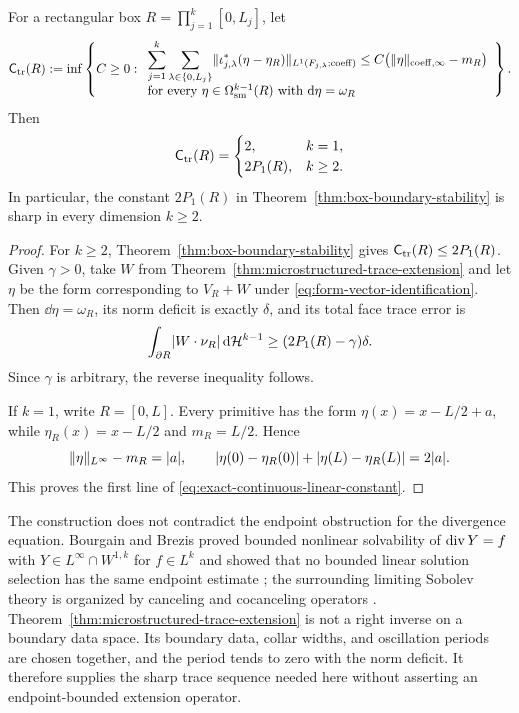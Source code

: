 \begin{theorem}
\label{thm:sharp-continuous-stability-constant}
For a rectangular box $R=\prod_{j=1}^k[0,L_j]$, let
\[
 \mathsf C_{\rm tr}(R):=
 \inf\left\{C\ge0:
 \begin{array}{l}
 \displaystyle
 \sum_{j=1}^k\sum_{\lambda\in\{0,L_j\}}
 \lVert \iota_{j,\lambda}^*(\eta-\eta_R) \rVert_{L^1(F_{j,\lambda};\mathrm{coeff})}
 \le C\bigl(\lVert \eta \rVert_{\mathrm{coeff},\infty}-m_R\bigr)\\[2mm]
 \text{for every }\eta\in\Omega^{k-1}_{\rm sm}(R)
 \text{ with }\mathrm{d}\eta=\omega_R
 \end{array}
 \right\}.
\]
Then
\begin{equation}
\label{eq:exact-continuous-linear-constant}
 \mathsf C_{\rm tr}(R)=
 \begin{cases}
 2, & k=1,\\
 2P_1(R), & k\ge2.
 \end{cases}
\end{equation}
In particular, the constant $2P_1(R)$ in
Theorem~\ref{thm:box-boundary-stability} is sharp in every dimension
$k\ge2$.
\end{theorem}

\begin{proof}
For $k\ge2$, Theorem~\ref{thm:box-boundary-stability} gives
$\mathsf C_{\rm tr}(R)\le2P_1(R)$.  Given $\gamma>0$, take $W$ from
Theorem~\ref{thm:microstructured-trace-extension} and let $\eta$ be the form
corresponding to $V_R+W$ under \eqref{eq:form-vector-identification}.  Then
$\dd\eta=\omega_R$, its norm deficit is exactly $\delta$, and its total face
trace error is
\[
 \int_{\partial R}\lvert W\cdot\nu_R \rvert\,\mathrm{d}\mathcal{H}^{k-1}
 \ge(2P_1(R)-\gamma)\delta.
\]
Since $\gamma$ is arbitrary, the reverse inequality follows.

If $k=1$, write $R=[0,L]$.  Every primitive has the form
$\eta(x)=x-L/2+a$, while $\eta_R(x)=x-L/2$ and $m_R=L/2$.  Hence
\[
 \lVert \eta \rVert_{L^\infty}-m_R=\lvert a \rvert,
 \qquad
 \lvert \eta(0)-\eta_R(0) \rvert+\lvert \eta(L)-\eta_R(L) \rvert=2\lvert a \rvert.
\]
This proves the first line of \eqref{eq:exact-continuous-linear-constant}.
\end{proof}

The construction does not contradict the endpoint obstruction for the
divergence equation.  Bourgain and Brezis proved bounded nonlinear solvability
of $\operatorname{div} Y=f$ with $Y\in L^\infty\cap W^{1,k}$ for $f\in L^k$ and showed that
no bounded linear solution selection has the same endpoint estimate
\cite{BourgainBrezis2003,BourgainBrezis2007}; the surrounding limiting
Sobolev theory is organized by canceling and cocanceling operators
\cite{VanSchaftingen2013}.  Theorem~\ref{thm:microstructured-trace-extension}
is not a right inverse on a boundary data space.  Its boundary data, collar
widths, and oscillation periods are chosen together, and the period tends to
zero with the norm deficit.  It therefore supplies the sharp trace sequence
needed here without asserting an endpoint-bounded extension operator.
